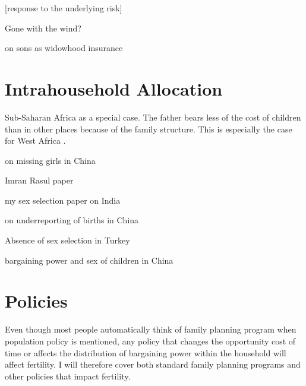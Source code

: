 \documentclass[letterpaper,12pt]{article}
\begin{document}
[response to the underlying risk]

Gone with the wind?

\citep{Lambert2016} on sons as widowhood insurance 

\citep{Adsera2011}


\section{Intrahousehold Allocation}

Sub-Saharan Africa as a special case.
The father bears less of the cost of children than
in other places because of the family structure.
This is especially the case for West Africa \citep{Caldwell1992}.


\citet{Ashraf2014}

\cite{merli00} on missing girls in China

Imran Rasul paper

\citep{Field2016}

my sex selection paper on India

\citet{merli00} on underreporting of births in China

Absence of sex selection in Turkey
\citet{Altindag2016}

bargaining power and sex of children in China \citet{Li2011}


\section{Policies}

Even though most people automatically think of family planning
program when population policy is mentioned, any policy that changes 
the opportunity cost of time or affects the distribution of
bargaining power within the household will affect fertility.
I will therefore cover both standard family planning programs
and other policies that impact fertility.

\end{document}
